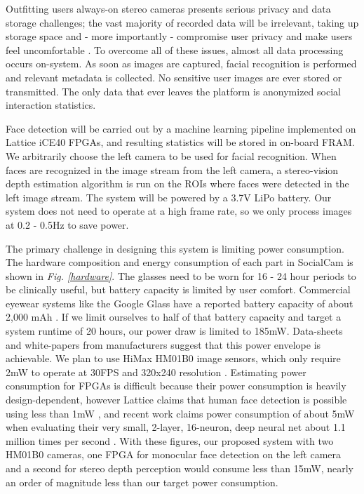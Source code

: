 Outfitting users always-on stereo cameras presents serious privacy and data storage challenges; the vast majority of recorded data will be irrelevant, taking up storage space and - more importantly - compromise user privacy and make users feel uncomfortable \cite{alharbi2018can}. To overcome all of these issues, almost all data processing occurs on-system. As soon as images are captured, facial recognition is performed and relevant metadata is collected. No sensitive user images are ever stored or transmitted. The only data that ever leaves the platform is anonymized social interaction statistics.

Face detection will be carried out by a machine learning pipeline implemented on Lattice iCE40 FPGAs, and resulting statistics will be stored in on-board FRAM. We arbitrarily choose the left camera to be used for facial recognition. When faces are recognized in the image stream from the left camera, a stereo-vision depth estimation algorithm is run on the ROIs where faces were detected in the left image stream. The system will be powered by a 3.7V LiPo battery. Our system does not need to operate at a high frame rate, so we only process images at 0.2 - 0.5Hz to save power.

The primary challenge in designing this system is limiting power consumption. The hardware composition and energy consumption of each part in SocialCam is shown in \textit{Fig. \ref{hardware}}. The glasses need to be worn for 16 - 24 hour periods to be clinically useful, but battery capacity is limited by user comfort. Commercial eyewear systems like the Google Glass have a reported battery capacity of about 2,000 mAh \cite{muensterer2014google}. If we limit ourselves to half of that battery capacity and target a system runtime of 20 hours, our power draw is limited to 185mW. Data-sheets and white-papers from manufacturers suggest that this power envelope is achievable. We plan to use HiMax HM01B0 image sensors, which only require 2mW to operate at 30FPS and 320x240 resolution \cite{hm01b0}. Estimating power consumption for FPGAs is difficult because their power consumption is heavily design-dependent, however Lattice claims that human face detection is possible using less than 1mW \cite{latticeAI}, and recent work claims power consumption of about 5mW when evaluating their very small, 2-layer, 16-neuron, deep neural net about 1.1 million times per second \cite{roukhami2019very}. With these figures, our proposed system with two HM01B0 cameras, one FPGA for monocular face detection on the left camera and a second for stereo depth perception would consume less than 15mW, nearly an order of magnitude less than our target power consumption.